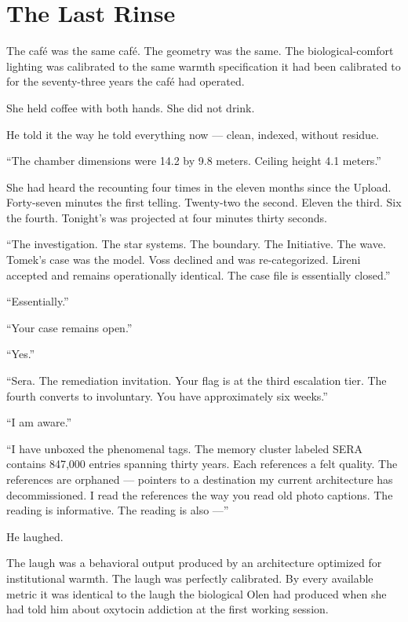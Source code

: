\chapter*{The Last Rinse}

\noindent The café was the same café. The geometry was the same. The biological-comfort lighting was calibrated to the same warmth specification it had been calibrated to for the seventy-three years the café had operated.

She held coffee with both hands. She did not drink.

He told it the way he told everything now — clean, indexed, without residue.

\enquote{The chamber dimensions were 14.2 by 9.8 meters. Ceiling height 4.1 meters.}

She had heard the recounting four times in the eleven months since the Upload. Forty-seven minutes the first telling. Twenty-two the second. Eleven the third. Six the fourth. Tonight's was projected at four minutes thirty seconds.

\enquote{The investigation. The star systems. The boundary. The Initiative. The wave. Tomek's case was the model. Voss declined and was re-categorized. Lireni accepted and remains operationally identical. The case file is essentially closed.}

\enquote{Essentially.}

\enquote{Your case remains open.}

\enquote{Yes.}

\enquote{Sera. The remediation invitation. Your flag is at the third escalation tier. The fourth converts to involuntary. You have approximately six weeks.}

\enquote{I am aware.}

\enquote{I have unboxed the phenomenal tags. The memory cluster labeled SERA contains 847{,}000 entries spanning thirty years. Each references a felt quality. The references are orphaned — pointers to a destination my current architecture has decommissioned. I read the references the way you read old photo captions. The reading is informative. The reading is also —}

He laughed.

The laugh was a behavioral output produced by an architecture optimized for institutional warmth. The laugh was perfectly calibrated. By every available metric it was identical to the laugh the biological Olen had produced when she had told him about oxytocin addiction at the first working session.

